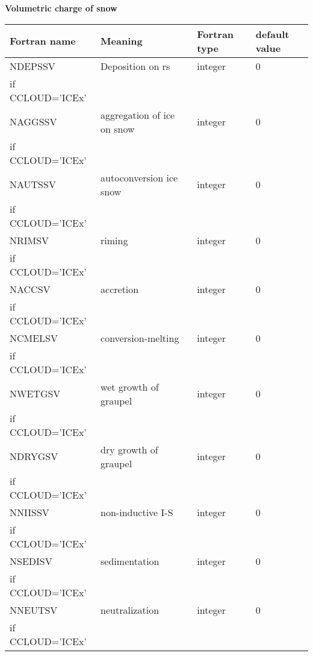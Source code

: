 \textbf{Volumetric charge of snow}
\begin{longtable} {|p{}|p{}|>{\centering}p{}|p{}<{\centering}|}
\hline
Fortran name & Meaning & Fortran type & default value \\
\hline \hline
\endhead
NDEPSSV & Deposition on rs& integer & 0 \\ \nopagebreak
if CCLOUD='ICEx' &&& \\\hline

NAGGSSV & aggregation of ice on snow & integer & 0 \\ \nopagebreak
if CCLOUD='ICEx' &&& \\\hline

NAUTSSV & autoconversion ice snow& integer & 0 \\ \nopagebreak
if CCLOUD='ICEx' &&& \\\hline

NRIMSV & riming & integer & 0 \\ \nopagebreak
if CCLOUD='ICEx' &&& \\\hline

NACCSV & accretion & integer & 0 \\ \nopagebreak
if CCLOUD='ICEx' &&& \\\hline

NCMELSV & conversion-melting & integer & 0 \\ \nopagebreak
if CCLOUD='ICEx' &&& \\\hline

NWETGSV & wet growth of graupel & integer & 0 \\ \nopagebreak
if CCLOUD='ICEx' &&& \\\hline

NDRYGSV & dry growth of graupel & integer & 0 \\ \nopagebreak
if CCLOUD='ICEx' &&& \\\hline

NNIISSV & non-inductive I-S & integer & 0 \\ \nopagebreak
if CCLOUD='ICEx' &&& \\\hline

NSEDISV & sedimentation& integer & 0 \\ \nopagebreak
if CCLOUD='ICEx' &&& \\\hline

NNEUTSV & neutralization & integer & 0 \\ \nopagebreak
if CCLOUD='ICEx' &&& \\\hline
\end{longtable}

